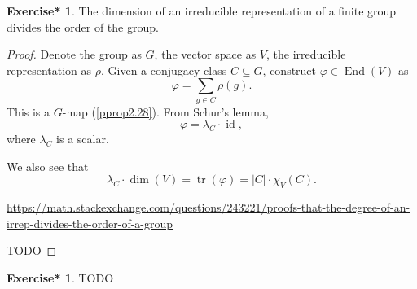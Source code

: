 \documentclass[12pt, letterpaper]{article}
\newcommand{\End}{\operatorname{End}}
\newcommand{\idt}{\operatorname{id}}
\newcommand{\red}[1]{{\color{red} #1}}
\newcommand{\card}[1]{\left\lvert #1 \right\rvert}
\DeclareMathOperator{\tr}{tr}
\theoremstyle{definition}
\theoremstyle{remark}
\theoremstyle{definition}
\newtheorem{exe*}[exe]{Exercise*}
\theoremstyle{plain}
\numberwithin{equation}{section}
\begin{document}
	\begin{exe*}
		The dimension of an irreducible representation of 
		a finite group divides the order of the group.
	\end{exe*}
	\begin{proof}
		Denote the group as $G$, the vector space as $V$, the irreducible representation as $\rho$.
		Given a conjugacy class $C\subseteq G$,
		construct $\varphi\in\End(V)$ as \[\varphi=\sum_{g\in C}\rho(g).\]
		This is a $G$-map (\autoref{pprop2.28}).
		From Schur's lemma,
		\[\varphi = \lambda_C \cdot \idt, \]
		where $\lambda_C$ is a scalar.
		
		We also see that
		\[\lambda_C\cdot \dim (V )= \tr(\varphi) = \card{C}\cdot \chi_V(C).\]

		\url{https://math.stackexchange.com/questions/243221/proofs-that-the-degree-of-an-irrep-divides-the-order-of-a-group}

		\red{TODO}
	\end{proof}
	\begin{exe*}
		\red{TODO}
	\end{exe*}
\end{document}
